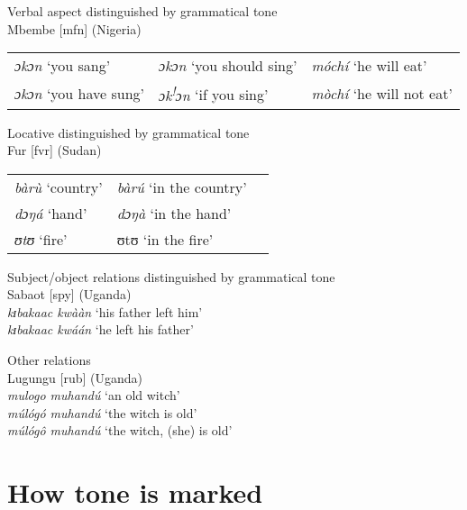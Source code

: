 \documentclass[output=paper]{langscibook}
\begin{document}
\ea Verbal aspect distinguished by grammatical tone\label{tab:VerbAspectByGrammaticalTone:4}\\Mbembe [mfn] (Nigeria) \citep{Barnwell1969}\smallskip\\
\begin{tabularx}{\linewidth}{@{}XXX@{}}
 \textit{ɔkɔn}  ‘you sang’         & \textit{ɔkɔn}  {‘you should sing’}                          & \textit{móchí}  ‘he will eat’    \\    
 \textit{ɔkɔn} {‘you have sung’}   & \textit{ɔk\textsuperscript{!}}\textit{ɔn}  ‘if you sing’    & \textit{mòchí}  ‘he will not eat’\\
\end{tabularx}
\z

\ea Locative distinguished by grammatical tone\label{tab:LocativeByGrammaticalTone:5}\\Fur [fvr] (Sudan) \citep[61]{Kutsch2014}\smallskip\\
\begin{tabularx}{\linewidth}{@{}XXX@{}}
 \textit{bàrù}  ‘country’ & \textit{bàrú}  ‘in the country’ & \\
 \textit{dɔŋá}  {‘hand’} & \textit{dɔŋà}  ‘in the hand’ & \\
 \textit{ʊtʊ}  ‘fire’ & ʊtʊ  ‘in the fire’ & \\
\end{tabularx}
\z

\ea Subject/object relations distinguished by grammatical tone\label{tab:SubjObjRelationsByTone:6}\\
Sabaot [spy]  (Uganda) \citep[66]{Kutsch2014}\smallskip\\
\textit{kɪbakaac kwààn}  ‘his father left him’\\
\textit{kɪbakaac kwáán}  ‘he left his father’\\
\z

\ea Other relations\label{tab:OtherRelations:7}\\
Lugungu [rub] (Uganda) \citep[10]{Moe1999}\smallskip\\
\textit{mulogo muhandú} ‘an old witch’ \\
\textit{múlógó muhandú} ‘the witch is old’ \\
\textit{múlógô muhandú} ‘the witch, (she) is old’ \\
\z

\section{How tone is marked}
\label{sec:HowToneMarked:3}
\end{document}

